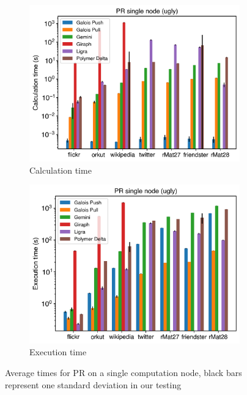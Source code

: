 \begin{figure}
	\hfil
	\begin{subfigure}{0.32\textwidth}
		\includegraphics[width=\linewidth]{../../plots/singleNodePR_calcTime.png}
		\caption{Calculation time}
		\label{fig:singleNodePR_calc}
	\end{subfigure}
	\hfil
	\begin{subfigure}{0.32\textwidth}
		\includegraphics[width=\linewidth]{../../plots/singleNodePR_execTime.png}
		\caption{Execution time}
		\label{fig:singleNodePR_exec}
	\end{subfigure}
	\hfil
	\caption{Average times for PR on a single computation node, black bars represent one standard deviation in our testing}
	\label{fig:singleNodePR}
\end{figure}

